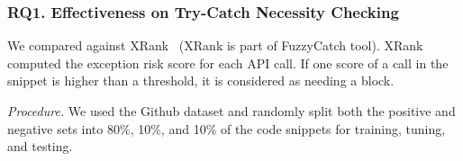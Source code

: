 


\subsubsection{RQ1. Effectiveness on Try-Catch Necessity Checking\\}

 We compared {\xblock} against
XRank~\cite{xrank-fse20} (XRank is part of FuzzyCatch tool). XRank
computed the exception risk score for each API call.
If one score of a call in the snippet is higher than a threshold,
it is considered as needing a  block.

{\em Procedure.} We used the Github dataset and randomly split both
the positive and negative sets into 80\%, 10\%, and 10\% of the code
snippets for training, tuning, and testing.



